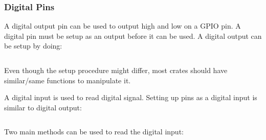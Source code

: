 \documentclass{beamer}
\begin{document}
\begin{frame}[allowframebreaks]
  \frametitle{Digital Pins}
  A digital output pin can be used to output high and low on a GPIO pin. A digital pin must be setup as an output before it can be used. A digital output can be setup by doing:
  \begin{columns}[t]
    \begin{column}{.5\linewidth}
      
    \end{column}
    \begin{column}{.5\linewidth}
      
    \end{column}
  \end{columns}

  Even though the setup procedure might differ, most crates should have similar/same functions to manipulate it.
  
  

  A digital input is used to read digital signal. Setting up pins as a digital input is similar to digital output:
  \begin{columns}[t]
    \begin{column}{.5\linewidth}
      
    \end{column}
    \begin{column}{.5\linewidth}
      
    \end{column}
  \end{columns}

  \pagebreak

  Two main methods can be used to read the digital input:
  
  
\end{frame}
\end{document}
